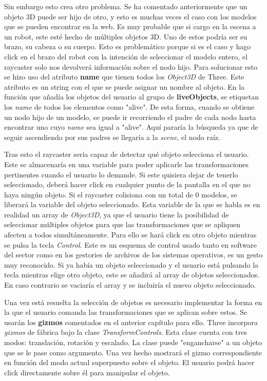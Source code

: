 Sin embargo esto crea otro problema. Se ha comentado anteriormente que un objeto 3D puede ser hijo de otro, y esto es muchas veces el caso con los modelos que se pueden encontrar en la web. Es muy probable que si cargo en la escena a un robot, este esté hecho de múltiples objetos 3D. Uno de estos podría ser su brazo, su cabeza o su cuerpo. Esto es problemático porque si es el caso y hago click en el brazo del robot con la intención de seleccionar el modelo entero, el raycaster solo nos devolverá información sobre el nodo hijo. Para solucionar esto se hizo uso del atributo \textbf{name} que tienen todos los \textit{Object3D} de Three. Este atributo es un string con el que se puede asignar un nombre al objeto. En la función que añadía los objetos del usuario al grupo de \textbf{liveObjects}, se etiquetan los \textit{name} de todos los elementos como "alive". De esta forma, cuando se obtiene un nodo hijo de un modelo, se puede ir recorriendo el padre de cada nodo hasta encontrar uno cuyo \textit{name} sea igual a "alive". Aquí pararía la búsqueda ya que de seguir ascendiendo por sus padres se llegaría a la \textit{scene}, el nodo raíz.

Tras esto el raycaster sería capaz de detectar qué objeto selecciona el usuario. Este se almacenaría en una variable para poder aplicarle las transformaciones pertinentes cuando el usuario lo demande. Si este quisiera dejar de tenerlo seleccionado, deberá hacer click en cualquier punto de la pantalla en el que no haya ningún objeto. Si el raycaster colisiona con un total de 0 modelos, se liberará la variable del objeto seleccionado. Esta variable de la que se habla es en realidad un array de \textit{Object3D}, ya que el usuario tiene la posibilidad de seleccionar múltiples objetos para que las transformaciones que se apliquen afecten a todos simultáneamente. Para ello se hará click en otro objeto mientras se pulsa la tecla \textit{Control}. Este es un esquema de control usado tanto en software del sector como en los gestories de archivos de los sistemas operativos, es un gesto muy reconocido. Si ya había un objeto seleccionado y el usuario está pulsando la tecla mientras elige otro objeto, este se añadirá al array de objetos seleccionados. En caso contrario se vaciaría el array y se incluiría el nuevo objeto seleccionado.

Una vez está resuelta la selección de objetos es necesario implementar la forma en la que el usuario comanda las transformaciones que se aplican sobre estos. Se usarán los \textbf{gizmos} comentados en el anterior capítulo para ello. Three incorpora \textit{gizmos} de fábrica bajo la clase \textit{TransformControls}. Esta clase cuenta con tres modos: translación, rotación y escalado. La clase puede "engancharse" a un objeto que se le pase como argumento. Una vez hecho mostrará el gizmo correspondiente en función del modo actual superpuesto sobre el objeto. El usuario podrá hacer click directamente sobre él para manipular el objeto.

